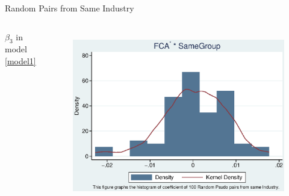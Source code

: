 \documentclass{beamer}
\begin{document}
	\begin{frame}{Random Pairs from Same Industry}
		
		\begin{columns}\centering
			\begin{center}
				$ \beta_3 $ in model \ref{model1}
			\end{center}
			\begin{figure}
				\centering
				\includegraphics[width=\linewidth]{IndustryPseudoSBFCA.eps}\\
				

\end{figure}
\end{columns}
\end{frame}
\end{document}

